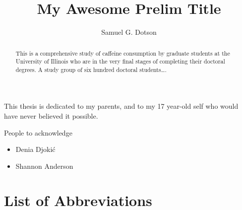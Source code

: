 \documentclass{uiucthesis2021}
\begin{document}
\title{My Awesome Prelim Title}
\author{Samuel G. Dotson}
\phdthesis
{}
\maketitle

\frontmatter

\begin{abstract}
This is a comprehensive study of caffeine consumption by graduate
students at the University of Illinois who are in the very final
stages of completing their doctoral degrees. A study group of six
hundred doctoral students\ldots.
\end{abstract}

\begin{dedication}
This thesis is dedicated to my parents, and to my 17 year-old self who would have never believed it possible.
\end{dedication}

\begin{acknowledgments}
People to acknowledge
\begin{itemize}
    \item Denia Djoki\'c
    \item Shannon Anderson
\end{itemize}
\end{acknowledgments}

{
    \hypersetup{linkcolor=black}  %
    \tableofcontents
}


\chapter{List of Abbreviations}

\begin{acronym}

\end{acronym}

\end{document}
